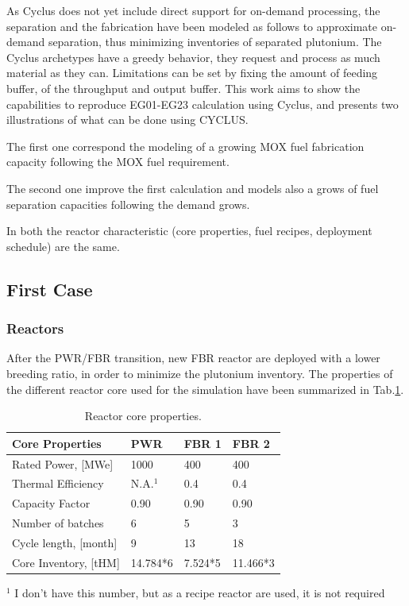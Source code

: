 \documentclass[12pt]{article}
\begin{document}
As Cyclus does not yet include direct support for
on-demand processing, the separation and the
fabrication have been modeled as follows to
approximate on-demand separation, thus minimizing
inventories of separated plutonium.
The Cyclus archetypes have a greedy behavior, they
request and process as much material as they can.
Limitations can be set by fixing the amount of
feeding buffer, of the throughput and output
buffer.
This work aims to show the capabilities to
reproduce EG01-EG23 calculation using Cyclus, and
presents two illustrations of what can be done
using CYCLUS.

The first one correspond the modeling
of a growing MOX fuel fabrication capacity
following the MOX fuel requirement.


The second one improve the first calculation and
models also a grows of fuel separation capacities
following the demand grows.

In both the reactor characteristic (core
properties, fuel recipes, deployment schedule) are
the same.

\subsection{First Case}
\subsubsection{Reactors}
After the PWR/FBR transition, new FBR reactor are
deployed with a lower breeding ratio, in order to
minimize the plutonium inventory. The properties
of the different reactor core used for the
simulation have been summarized in
Tab.\ref{tab:reactor}.\\
\begin{table}[h!]
\centering
\begin{tabularx}{350pt}{lXXX}
\hline
Core Properties       &	PWR     &	FBR 1   &	FBR 2     \\
\hline
Rated Power, [MWe]    &	1000		&	400     &	400       \\
Thermal Efficiency    &	N.A.$^1$	&	0.4     &	0.4       \\
Capacity Factor       &	0.90		&	0.90		&	0.90      \\
Number of batches     &	6       &	5       &	3         \\
Cycle length, [month] &	9       &	13      &	18        \\
Core Inventory, [tHM] &	14.784*6&	7.524*5	&	11.466*3  \\
\hline
\end{tabularx}
\caption{Reactor core properties.}
\label{tab:reactor}
\footnotesize{$^1$ I don't have this number, but as a recipe reactor are used, it is not required}
\end{table}
\end{document}

